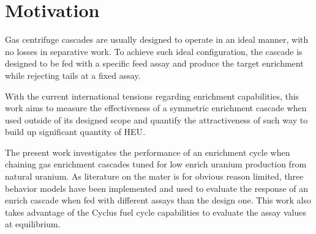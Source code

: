 \section{Motivation}

Gas centrifuge cascades are usually designed to operate in an ideal manner, with
no losses in separative work. To achieve such ideal configuration, the cascade
is designed to be fed with a specific feed assay and produce the target
enrichment while rejecting tails at a fixed assay.

With the current international tensions regarding enrichment capabilities, this
work aims to measure the effectiveness of a symmetric enrichment cascade when
used outside of its designed scope and quantify the attractiveness of such way
to build up significant quantity of \gls{HEU}.

The present work investigates the performance of an enrichment cycle when chaining
gas enrichment cascades tuned for low enrich uranium production from natural
uranium. As literature on the mater is for obvious reason limited, three
behavior models have been implemented and used to evaluate the response of an
enrich cascade when fed with different assays than the design one. This work
also takes advantage of the Cyclus\cite{cyclus} fuel cycle capabilities to
evaluate the assay values at equilibrium.

